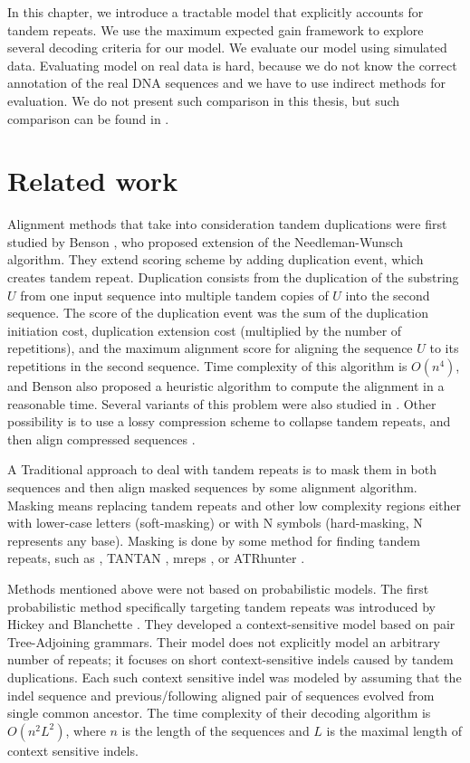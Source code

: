 In this chapter, we introduce a tractable model that explicitly accounts for
tandem repeats. We use the maximum expected gain framework to explore several
decoding criteria for our model. We evaluate our model using simulated data.
Evaluating model on real data is hard, because we do not know the correct
annotation of the real DNA sequences and we have to use indirect methods for
evaluation. We do not present such comparison in this thesis, but such
comparison can be found in \cite{Nanasi2014}.

\section{Related work}\label{SECTION:REPALNMETHODS}

Alignment methods that take into consideration tandem duplications were first
studied by Benson \cite{Benson1997}, who proposed extension of the
Needleman-Wunsch algorithm. They extend scoring scheme by adding duplication
event, which creates tandem repeat. Duplication consists from
the duplication of the substring $U$ from one input sequence into multiple
tandem copies of $U$ into the second sequence. The score of the duplication
event was the sum of the duplication initiation cost, duplication extension
cost (multiplied by the number of repetitions), and the maximum alignment score
for aligning the sequence $U$ to its repetitions in the second sequence. Time
complexity of this algorithm is $O(n^4)$, and Benson also proposed a heuristic
algorithm to compute the alignment in a reasonable time.  Several variants of
this problem were also studied in \cite{Sammeth2006, Berard2006}. Other
possibility is to use a lossy compression scheme to collapse tandem repeats,
and then align compressed sequences \cite{Freschi2012}.

A Traditional approach to deal with tandem repeats is to mask them in both
sequences and then align masked sequences by some alignment algorithm.  Masking
means replacing tandem repeats and other low complexity regions either with
lower-case letters (soft-masking) or with N symbols (hard-masking, N represents
any base). Masking is done by some method for finding tandem repeats, such as
 \cite{Benson1999}, TANTAN
\cite{Frith2011}, mreps \cite{Kolpakov2003}, or ATRhunter \cite{Wexler2005}. 

Methods mentioned above were not based on probabilistic models. The first
probabilistic method specifically targeting tandem repeats was introduced by
Hickey and Blanchette \cite{Hickey2011}.  They developed a context-sensitive
model based on pair Tree-Adjoining grammars.  Their model does not explicitly
model an arbitrary number of repeats; it focuses on short context-sensitive
indels caused by tandem duplications. Each such context sensitive indel was
modeled by assuming that the indel sequence and previous/following aligned pair
of sequences evolved from single common ancestor. The time complexity of their
decoding algorithm is $O(n^2L^2)$, where $n$ is the length of the sequences and
$L$ is the maximal length of context sensitive indels.

